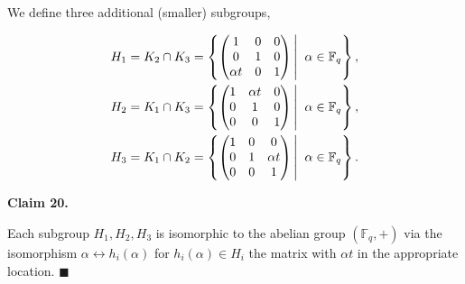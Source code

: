 We define three additional (smaller) subgroups,\par


\[\begin{gathered}
\displaystyle H_{1}=K_{2}\cap K_{3}=\left\{\begin{pmatrix}1&0&0\\
0&1&0\\
\alpha t&0&1\end{pmatrix}\left|\;\vphantom{\begin{pmatrix}1&0&0\\
0&1&0\\
\alpha t&0&1\end{pmatrix}\alpha\in\mathbb{F}_{q}}\right.\alpha\in\mathbb{F}_{q}\right\}, \\
\displaystyle H_{2}=K_{1}\cap K_{3}=\left\{\begin{pmatrix}1&\alpha t&0\\
0&1&0\\
0&0&1\end{pmatrix}\left|\;\vphantom{\begin{pmatrix}1&\alpha t&0\\
0&1&0\\
0&0&1\end{pmatrix}\alpha\in\mathbb{F}_{q}}\right.\alpha\in\mathbb{F}_{q}\right\}, \\
\displaystyle H_{3}=K_{1}\cap K_{2}=\left\{\begin{pmatrix}1&0&0\\
0&1&\alpha t\\
0&0&1\end{pmatrix}\left|\;\vphantom{\begin{pmatrix}1&0&0\\
0&1&\alpha t\\
0&0&1\end{pmatrix}\alpha\in\mathbb{F}_{q}}\right.\alpha\in\mathbb{F}_{q}\right\}.
\end{gathered}\]





\par\medskip\noindent\textbf{
Claim 20. 
}\par



Each subgroup $H_{1},H_{2},H_{3}$ is isomorphic to the abelian group $(\mathbb{F}_{q},+)$ via the isomorphism $\alpha\leftrightarrow h_{i}(\alpha)$ for
$h_{i}(\alpha)\in H_{i}$ the matrix with $\alpha t$ in the appropriate location. \ensuremath{\blacksquare}\par



